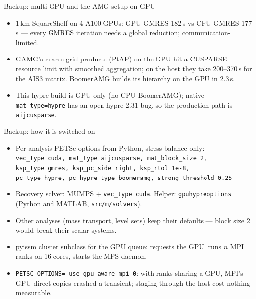 \documentclass[10pt,aspectratio=169]{beamer}
\begin{document}
\begin{frame}{Backup: multi-GPU and the AMG setup on GPU}
  \begin{itemize}
    \item 1\,km SquareShelf on 4 A100 GPUs: GPU GMRES 182\,s vs CPU GMRES 177\,s ---
          every GMRES iteration needs a global reduction; communication-limited.
    \item GAMG's coarse-grid products (PtAP) on the GPU hit a CUSPARSE resource
          limit with smoothed aggregation; on the host they take 200--370\,s for the
          AIS3 matrix. BoomerAMG builds its hierarchy on the GPU in 2.3\,s.
    \item This hypre build is GPU-only (no CPU BoomerAMG); native
          \texttt{mat\_type=hypre} has an open hypre 2.31 bug, so the production
          path is \texttt{aijcusparse}.
  \end{itemize}
\end{frame}

\begin{frame}{Backup: how it is switched on}
  \small
  \begin{itemize}
    \item Per-analysis PETSc options from Python, stress balance only:\\
          \texttt{vec\_type cuda, mat\_type aijcusparse, mat\_block\_size 2,}\\
          \texttt{ksp\_type gmres, ksp\_pc\_side right, ksp\_rtol 1e-8,}\\
          \texttt{pc\_type hypre, pc\_hypre\_type boomeramg, strong\_threshold 0.25}
    \item Recovery solver: MUMPS + \texttt{vec\_type cuda}. Helper:
          \texttt{gpuhypreoptions} (Python and MATLAB, \texttt{src/m/solvers}).
    \item Other analyses (mass transport, level sets) keep their defaults --- block
          size 2 would break their scalar systems.
    \item pyissm cluster subclass for the GPU queue: requests the GPU, runs $n$ MPI
          ranks on 16 cores, starts the MPS daemon.
    \item \texttt{PETSC\_OPTIONS=-use\_gpu\_aware\_mpi 0}: with ranks sharing a GPU,
          MPI's GPU-direct copies crashed a transient; staging through the host
          cost nothing measurable.
  \end{itemize}
\end{frame}
\end{document}
